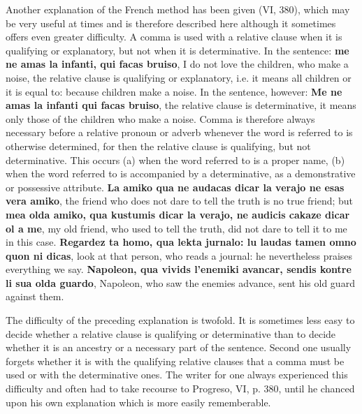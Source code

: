 Another explanation of the French method has been given (VI, 380), which may be very useful at times and is therefore described here although it sometimes offers even greater difficulty. A comma is used with a relative clause when it is qualifying or explanatory, but not when it is determinative. In the sentence: \textbf{me ne amas la infanti, qui facas bruiso}, I do not love the children, who make a noise, the relative clause is qualifying or explanatory, i.e. it means all children or it is equal to: because children make a noise. In the sentence, however: \textbf{Me ne amas la infanti qui facas bruiso}, the relative clause is determinative, it means only those of the children who make a noise. Comma is therefore always necessary before a relative pronoun or adverb whenever the word is referred to is otherwise determined, for then the relative clause is qualifying, but not determinative. This occurs (a) when the word referred to is a proper name, (b) when the word referred to is accompanied by a determinative, as a demonstrative or possessive attribute. \textbf{La amiko qua ne audacas dicar la verajo ne esas vera amiko}, the friend who does not dare to tell the truth is no true friend; but \textbf{mea olda amiko, qua kustumis dicar la verajo, ne audicis cakaze dicar ol a me}, my old friend, who used to tell the truth, did not dare to tell it to me in this case. \textbf{Regardez ta homo, qua lekta jurnalo: lu laudas tamen omno quon ni dicas}, look at that person, who reads a journal: he nevertheless praises everything we say. \textbf{Napoleon, qua vivids l'enemiki avancar, sendis kontre li sua olda guardo}, Napoleon, who saw the enemies advance, sent his old guard against them.

The difficulty of the preceding explanation is twofold. It is sometimes less easy to decide whether a relative clause is qualifying or determinative than to decide whether it is an ancestry or a necessary part of the sentence. Second one usually forgets whether it is with the qualifying relative clauses that a comma must be used or with the determinative ones. The writer for one always experienced this difficulty and often had to take recourse to Progreso, VI, p. 380, until he chanced upon his own explanation which is more easily rememberable.

